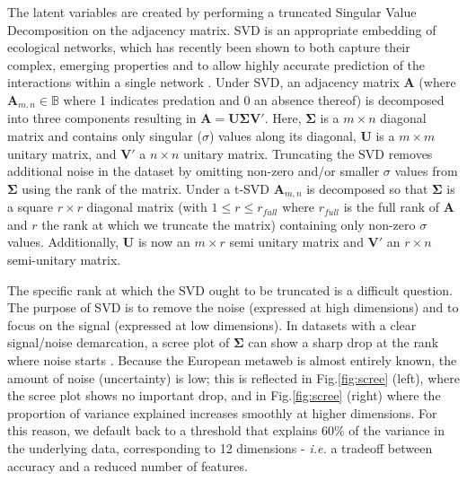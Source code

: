 The latent variables are created by performing a truncated Singular
Value Decomposition \cite{t-SVD; @Halko2011FinStr} on the adjacency
matrix. SVD is an appropriate embedding of ecological networks, which
has recently been shown to both capture their complex, emerging
properties \cite{Strydom2021SvdEnt} and to allow highly accurate
prediction of the interactions within a single network
\cite{Poisot2021ImpMam}. Under SVD, an adjacency matrix \(\mathbf{A}\)
(where \(\mathbf{A}_{m,n}\in\mathbb{B}\) where 1 indicates predation and
0 an absence thereof) is decomposed into three components resulting in
\(\mathbf{A} = \mathbf{U}\mathbf{\Sigma}\mathbf{V'}.\) Here,
\(\mathbf{\Sigma}\) is a \(m \times n\) diagonal matrix and contains
only singular (\(\sigma\)) values along its diagonal, \(\mathbf{U}\) is
a \(m \times m\) unitary matrix, and \(\mathbf{V}'\) a \(n \times n\)
unitary matrix. Truncating the SVD removes additional noise in the
dataset by omitting non-zero and/or smaller \(\sigma\) values from
\(\mathbf{\Sigma}\) using the rank of the matrix. Under a t-SVD
\(\mathbf{A}_{m,n}\) is decomposed so that \(\mathbf{\Sigma}\) is a
square \(r \times r\) diagonal matrix (with \(1 \le r \le r_{full}\)
where \(r_{full}\) is the full rank of \(\mathbf{A}\) and \(r\) the rank
at which we truncate the matrix) containing only non-zero \(\sigma\)
values. Additionally, \(\mathbf{U}\) is now an \(m \times r\) semi
unitary matrix and \(\mathbf{V}'\) an \(r \times n\) semi-unitary
matrix.

The specific rank at which the SVD ought to be truncated is a difficult
question. The purpose of SVD is to remove the noise (expressed at high
dimensions) and to focus on the signal (expressed at low dimensions). In
datasets with a clear signal/noise demarcation, a scree plot of
\(\mathbf{\Sigma}\) can show a sharp drop at the rank where noise starts
\cite{Zhu2006AutDim}. Because the European metaweb is almost entirely
known, the amount of noise (uncertainty) is low; this is reflected in
Fig.\ref{fig:scree} (left), where the scree plot shows no important drop, and in
Fig.\ref{fig:scree} (right) where the proportion of variance explained increases
smoothly at higher dimensions. For this reason, we default back to a
threshold that explains 60\% of the variance in the underlying data,
corresponding to 12 dimensions - \emph{i.e.} a tradeoff between accuracy
and a reduced number of features.


